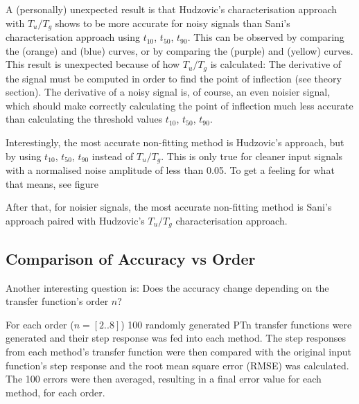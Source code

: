 A (personally) unexpected  result  is  that Hudzovic's characterisation approach
with  $T_u/T_g$  shows  to  be  more  accurate for  noisy  signals  than  Sani's
characterisation  approach  using $t_{10}$,  $t_{50}$,  $t_{90}$.  This  can  be
observed  by comparing the (orange) and  (blue)  curves,  or  by  comparing  the
(purple) and (yellow) curves. This result is unexpected because of how $T_u/T_g$
is calculated: The derivative of  the  signal  must be computed in order to find
the point of inflection (see theory section). The  derivative  of a noisy signal
is, of course, an even noisier signal, 
which should make correctly  calculating  the  point  of  inflection  much  less
accurate  than calculating the threshold values  $t_{10}$,  $t_{50}$,  $t_{90}$.

Interestingly, the  most accurate non-fitting method is Hudzovic's approach, but
by using $t_{10}$, $t_{50}$, $t_{90}$ instead of  $T_u/T_g$.  This  is only true
for cleaner input signals with a normalised noise amplitude of less  than  0.05.
To get a feeling  for  what that means, see figure 

After that, for noisier signals,  the most accurate non-fitting method is Sani's
approach   paired   with   Hudzovic's   $T_u/T_g$   characterisation   approach.


\subsection{Comparison of Accuracy vs Order}

Another  interesting  question  is:  Does  the accuracy change depending on  the
transfer function's order $n$?

For each order ($n=[2..8]$) 100 randomly generated  PTn  transfer functions were
generated and their step response was fed into each  method.  The step responses
from each method's transfer function were then  compared with the original input
function's step response and the root mean square error (RMSE)  was  calculated.
The  100  errors  were then averaged, resulting in a final error value for  each
method, for each order.


